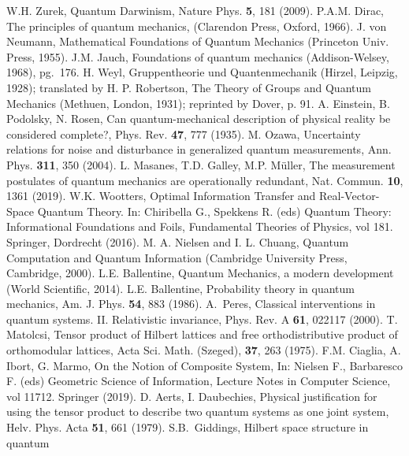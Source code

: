 \documentclass[aps,prl,amsmath,amssymb,twocolumn,nofootinbib]{revtex4}
\theoremstyle{plain}
\theoremstyle{definition}
\theoremstyle{remark}
\begin{document}
	\begin{references}
		 W.H. Zurek, Quantum Darwinism, Nature Phys. {\bf 5},
		181 (2009).
		P.A.M. Dirac, The principles of quantum mechanics,
		(Clarendon Press, Oxford, 1966).
		J. von Neumann, Mathematical Foundations of
		Quantum Mechanics (Princeton Univ.  Press, 1955).
		J.M. Jauch, Foundations of quantum mechanics
		(Addison-Welsey, 1968), pg.~176.
		 H. Weyl, Gruppentheorie und Quantenmechanik (Hirzel,
		Leipzig, 1928); translated by H. P. Robertson, The Theory of Groups
		and Quantum Mechanics (Methuen, London, 1931); reprinted by Dover,
		p. 91.
		A. Einstein, B. Podolsky, N. Rosen, Can
		quantum-mechanical description of physical reality be considered
		complete?, Phys. Rev. {\bf 47}, 777 (1935).
		M. Ozawa, {Uncertainty relations for noise and
			disturbance in generalized quantum measurements}, Ann. Phys.  {\bf
			311}, 350 (2004).
		L. Masanes, T.D. Galley, M.P. M\" uller, The
		measurement postulates of quantum mechanics are operationally
		redundant, Nat. Commun. {\bf 10}, 1361 (2019).
		W.K. Wootters, Optimal Information Transfer and
		Real-Vector-Space Quantum Theory. In: Chiribella G., Spekkens R.
		(eds) Quantum Theory: Informational Foundations and Foils,
		Fundamental Theories of Physics, vol 181. Springer, Dordrecht
		(2016).
		M. A. Nielsen and I. L. Chuang, Quantum Computation
		and Quantum Information (Cambridge University Press, Cambridge,
		2000).
		L.E. Ballentine, Quantum Mechanics, a modern
		development (World Scientific, 2014).
		L.E. Ballentine, Probability theory in
		quantum mechanics, Am. J. Phys. {\bf 54}, 883 (1986).
		A.~Peres, Classical interventions in quantum systems.
		II. Relativistic invariance, Phys. Rev. A {\bf 61}, 022117 (2000).
		 T. Matolcsi, Tensor product of Hilbert lattices and
		free orthodistributive product of orthomodular lattices, Acta Sci.
		Math. (Szeged), {\bf 37}, 263 (1975).
		 F.M. Ciaglia, A. Ibort, G. Marmo, On the Notion of
		Composite System, In: Nielsen F., Barbaresco F. (eds) Geometric
		Science of Information, Lecture Notes in Computer Science, vol
		11712. Springer (2019).
		 D. Aerts, I. Daubechies, Physical justification for
		using the tensor product to describe two quantum systems as one
		joint system, Helv. Phys. Acta {\bf 51}, 661 (1979).
		S.B.~Giddings, Hilbert space structure in quantum

\end{references}
\end{document}
